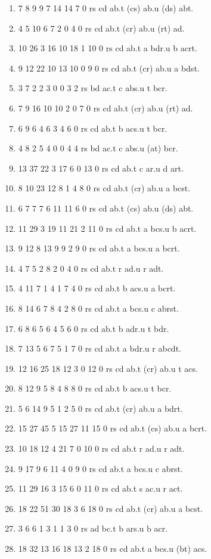 \documentclass[10pt,journal]{IEEEtran}
\begin{document}
\begin{enumerate}
\item 7 8 9 9 7 14 14 7 0 rs cd ab.t (cs) ab.u (ds) abt.
\item 4 5 10 6 7 2 0 4 0 rs cd ab.t (cr) ab.u (rt) ad.
\item 10 26 3 16 10 18 1 10 0 rs cd ab.t a bdr.u b acrt.
\item 9 12 22 10 13 10 0 9 0 rs cd ab.t (cr) ab.u a bdst.
\item 3 7 2 2 3 0 0 3 2 rs bd ac.t c abs.u t bcr.
\item 7 9 16 10 10 2 0 7 0 rs cd ab.t (cr) ab.u (rt) ad.
\item 6 9 6 4 6 3 4 6 0 rs cd ab.t b acs.u t bcr.
\item 4 8 2 5 4 0 0 4 4 rs bd ac.t c abs.u (at) bcr.
\item 13 37 22 3 17 6 0 13 0 rs cd ab.t c ar.u d art.
\item 8 10 23 12 8 1 4 8 0 rs cd ab.t (cr) ab.u a bcst.
\item 6 7 7 7 6 11 11 6 0 rs cd ab.t (cs) ab.u (ds) abt.
\item 11 29 3 19 11 21 2 11 0 rs cd ab.t a bcs.u b acrt.
\item 9 12 8 13 9 9 2 9 0 rs cd ab.t a bcs.u a bcrt.
\item 4 7 5 2 8 2 0 4 0 rs cd ab.t r ad.u r adt.
\item 4 11 7 1 4 1 7 4 0 rs cd ab.t b acs.u a bcrt.
\item 8 14 6 7 8 4 2 8 0 rs cd ab.t a bcs.u c abrst.
\item 6 8 6 5 6 4 5 6 0 rs cd ab.t b adr.u t bdr.
\item 7 13 5 6 7 5 1 7 0 rs cd ab.t a bdr.u r abcdt.
\item 12 16 25 18 12 3 0 12 0 rs cd ab.t (cr) ab.u t acs.
\item 8 12 9 5 8 4 8 8 0 rs cd ab.t b acs.u t bcr.
\item 5 6 14 9 5 1 2 5 0 rs cd ab.t (cr) ab.u a bdrt.
\item 15 27 45 5 15 27 11 15 0 rs cd ab.t (cs) ab.u a bcrt.
\item 10 18 12 4 21 7 0 10 0 rs cd ab.t r ad.u r adt.
\item 9 17 9 6 11 4 0 9 0 rs cd ab.t a bcs.u c abrst.
\item 11 29 16 3 15 6 0 11 0 rs cd ab.t s ac.u r act.
\item 18 22 51 30 18 3 6 18 0 rs cd ab.t (cr) ab.u a bcst.
\item 3 6 6 1 3 1 1 3 0 rs ad bc.t b ars.u b acr.
\item 18 32 13 16 18 13 2 18 0 rs cd ab.t a bcs.u (bt) acs.

\end{enumerate}
\end{document}
